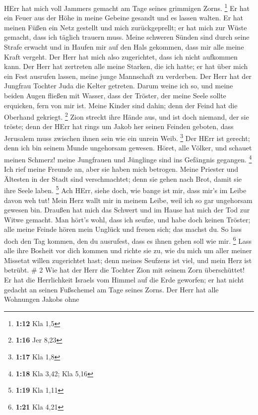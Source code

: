 HErr hat mich voll Jammers gemacht am Tage seines grimmigen Zorns.
\footnote{\textbf{1:12} Kla 1,5}  Er hat ein Feuer aus der
Höhe in meine Gebeine gesandt und es lassen walten. Er hat meinen Füßen
ein Netz gestellt und mich zurückgeprellt; er hat mich zur Wüste
gemacht, dass ich täglich trauern muss.  Meine schweren
Sünden sind durch seine Strafe erwacht und in Haufen mir auf den Hals
gekommen, dass mir alle meine Kraft vergeht. Der Herr hat mich also
zugerichtet, dass ich nicht aufkommen kann.  Der Herr hat
zertreten alle meine Starken, die ich hatte; er hat über mich ein Fest
ausrufen lassen, meine junge Mannschaft zu verderben. Der Herr hat der
Jungfrau Tochter Juda die Kelter getreten.  Darum weine ich
so, und meine beiden Augen fließen mit Wasser, dass der Tröster, der
meine Seele sollte erquicken, fern von mir ist. Meine Kinder sind dahin;
denn der Feind hat die Oberhand gekriegt. \footnote{\textbf{1:16} Jer
  8,23}  Zion streckt ihre Hände aus, und ist doch niemand,
der sie tröste; denn der HErr hat rings um Jakob her seinen Feinden
geboten, dass Jerusalem muss zwischen ihnen sein wie ein unrein Weib.
\footnote{\textbf{1:17} Kla 1,8}  Der HErr ist gerecht;
denn ich bin seinem Munde ungehorsam gewesen. Höret, alle Völker, und
schauet meinen Schmerz! meine Jungfrauen und Jünglinge sind ins
Gefängnis gegangen. \footnote{\textbf{1:18} Kla 3,42; Kla 5,16}
 Ich rief meine Freunde an, aber sie haben mich betrogen.
Meine Priester und Ältesten in der Stadt sind verschmachtet; denn sie
gehen nach Brot, damit sie ihre Seele laben. \footnote{\textbf{1:19} Kla
  1,11}  Ach HErr, siehe doch, wie bange ist mir, dass
mir's im Leibe davon weh tut! Mein Herz wallt mir in meinem Leibe, weil
ich so gar ungehorsam gewesen bin. Draußen hat mich das Schwert und im
Hause hat mich der Tod zur Witwe gemacht.  Man hört's wohl,
dass ich seufze, und habe doch keinen Tröster; alle meine Feinde hören
mein Unglück und freuen sich; das machst du. So lass doch den Tag
kommen, den du ausrufest, dass es ihnen gehen soll wie mir. \footnote{\textbf{1:21}
  Kla 4,21}  Lass alle ihre Bosheit vor dich kommen und
richte sie zu, wie du mich um aller meiner Missetat willen zugerichtet
hast; denn meines Seufzens ist viel, und mein Herz ist betrübt. \# 2
 Wie hat der Herr die Tochter Zion mit seinem Zorn
überschüttet! Er hat die Herrlichkeit Israels vom Himmel auf die Erde
geworfen; er hat nicht gedacht an seinen Fußschemel am Tage seines
Zorns.  Der Herr hat alle Wohnungen Jakobs ohne
